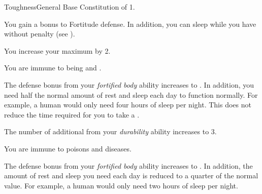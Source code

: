     \begin{feat}{Toughness}{General}
        \featpre Base Constitution of 1.

         You gain a  bonus to Fortitude defense.
        In addition, you can sleep while you have  without penalty (see ).

         You increase your maximum  by 2.

         You are immune to being  and .

         The defense bonus from your \textit{fortified body} ability increases to .
        In addition, you need half the normal amount of rest and sleep each day to function normally.
        For example, a human would only need four hours of sleep per night.
        This does not reduce the time required for you to take a .

         The number of additional  from your \textit{durability} ability increases to 3.

         You are immune to poisons and diseases.

         The defense bonus from your \textit{fortified body} ability increases to .
        In addition, the amount of rest and sleep you need each day is reduced to a quarter of the normal value.
        For example, a human would only need two hours of sleep per night.
    \end{feat}

